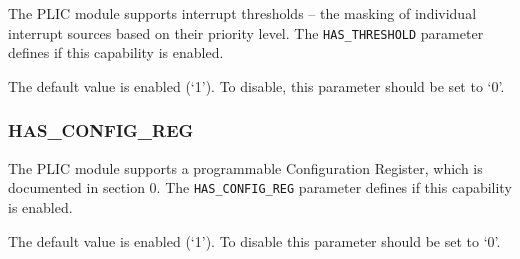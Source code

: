 The PLIC module supports interrupt thresholds -- the masking of
individual interrupt sources based on their priority level. The
\texttt{HAS\_THRESHOLD} parameter defines if this capability is enabled.

The default value is enabled (`1'). To disable, this parameter should be
set to `0'.

\subsubsection{HAS\_CONFIG\_REG}

The PLIC module supports a programmable Configuration Register, which is
documented in section 0. The \texttt{HAS\_CONFIG\_REG} parameter defines
if this capability is enabled.

The default value is enabled (`1'). To disable this parameter should be
set to `0'.
